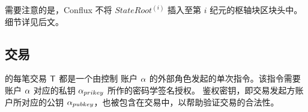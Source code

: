 需要注意的是，Conflux 不将 $StateRoot^{(i)}$ 插入至第 $i$ 纪元的枢轴块区块头中。细节详见后文。


\subsection{交易}
\label{sec:tx}

{\name} 的每笔交易 $\textsf{T}$ 都是一个由控制 {\name} 账户 $\mathbf{\alpha}$ 的外部角色发起的单次指令。该指令需要账户 $\mathbf{\alpha}$ 对应的私钥 $\mathbf{\alpha}_{prikey}$ 所作的密码学签名授权。
鉴权密钥，即交易发起方账户所对应的公钥 $\mathbf{\alpha}_{pubkey}$，也被包含在交易中，以帮助验证交易的合法性。

